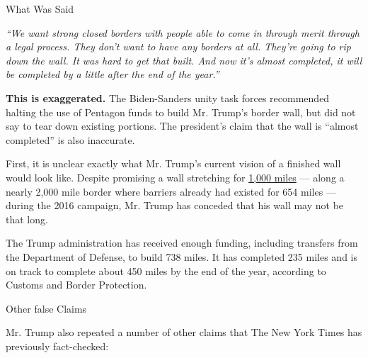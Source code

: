 What Was Said

\emph{``We want strong closed borders with people able to come in
through merit through a legal process. They don't want to have any
borders at all. They're going to rip down the wall. It was hard to get
that built. And now it's almost completed, it will be completed by a
little after the end of the year.''}

\textbf{This is exaggerated.} The Biden-Sanders unity task forces
recommended halting the use of Pentagon funds to build Mr. Trump's
border wall, but did not say to tear down existing portions. The
president's claim that the wall is ``almost completed'' is also
inaccurate.

First, it is unclear exactly what Mr. Trump's current vision of a
finished wall would look like. Despite promising a wall stretching for
\href{https://www.nytimes3xbfgragh.onion/2018/01/18/us/politics/trump-border-wall-immigration.html}{1,000
miles} --- along a nearly 2,000 mile border where barriers already had
existed for 654 miles --- during the 2016 campaign, Mr. Trump has
conceded that his wall may not be that long.

The Trump administration has received enough funding, including
transfers from the Department of Defense, to build 738 miles. It has
completed 235 miles and is on track to complete about 450 miles by the
end of the year, according to Customs and Border Protection.

Other false Claims

Mr. Trump also repeated a number of other claims that The New York Times
has previously fact-checked:

